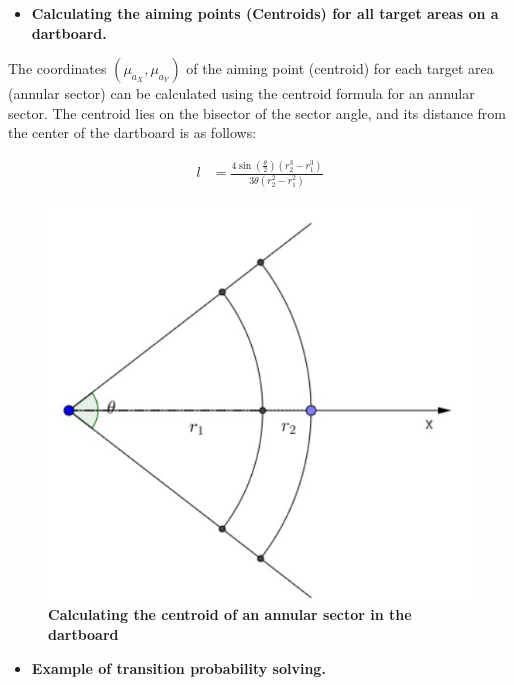 \documentclass[cjjs]{ipart}
\theoremstyle{plain}
\begin{document}
\begin{itemize}
    \item \textbf{Calculating the aiming points (Centroids) for all target areas on a dartboard.}
\end{itemize}

The coordinates $(\mu_{a_X}, \mu_{a_Y})$ of the aiming point (centroid) for each target area (annular sector) can be calculated using the centroid formula for an annular sector. The centroid lies on the bisector of the sector angle, and its distance from the center of the dartboard is as follows:


\begin{figure}[h]
\begin{minipage}{0.5\textwidth}
    \begin{align*}
    l &= \frac{4 \sin\left(\frac{\theta}{2}\right) \left( r_2^3 - r_1^3 \right)}{3 \theta \left( r_2^2 - r_1^2 \right)}
    \end{align*}
\end{minipage}
\begin{minipage}{0.5\textwidth} 
    \centering
    \includegraphics[width=\textwidth]{9.png}
\end{minipage}
\caption{\textbf{Calculating the centroid of an annular sector in the dartboard}}
\end{figure}

\begin{itemize}
    \item \textbf{Example of transition probability solving.}
\end{itemize}
\end{document}
